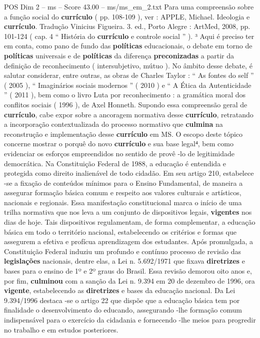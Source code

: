 \begin{textsample}{POS Dim 2 – ms – Score 43.00 – ms/ms\_em\_2.txt}
Para uma compreensão sobre a função social do \textbf{currículo} ( pp. 108-109 ), ver : APPLE, Michael.
Ideologia e \textbf{currículo}.
Tradução Vinicius Figueira. 3. ed., Porto Alegre : ArtMed, 2008, pp. 101-124 ( cap. 4 “ História do \textbf{currículo} e controle social ” ). ³ Aqui é preciso ter em conta, como pano de fundo das \textbf{políticas} educacionais, o debate em torno de \textbf{políticas} universais e de \textbf{políticas} da diferença \textbf{preconizadas} a partir da definição de reconhecimento ( intersubjetivo, mútuo ).
No âmbito desse debate, é salutar considerar, entre outras, as obras de Charles Taylor : “ As fontes do self ” ( 2005 ), “ Imaginários sociais modernos ” ( 2010 ) e “ A Ética da Autenticidade ” ( 2011 ), bem como o livro Luta por reconhecimento : a gramática moral dos conflitos sociais ( 1996 ), de Axel Honneth.
Supondo essa compreensão geral de \textbf{currículo}, cabe expor sobre a ancoragem normativa desse \textbf{currículo}, retratando a incorporação contextualizada do processo normativo que \textbf{culmina} na reconstrução e implementação desse \textbf{currículo} em MS.
O escopo deste tópico concerne mostrar o porquê do novo \textbf{currículo} e sua base legal⁴, bem como evidenciar os esforços empreendidos no sentido de provê -lo de legitimidade democrática.
Na Constituição Federal de 1988, a educação é entendida e protegida como direito inalienável de todo cidadão.
Em seu artigo 210, estabelece -se a fixação de conteúdos mínimos para o Ensino Fundamental, de maneira a assegurar formação básica comum e respeito aos valores culturais e artísticos, nacionais e regionais.
Essa manifestação constitucional marca o início de uma trilha normativa que nos leva a um conjunto de dispositivos legais, \textbf{vigentes} nos dias de hoje.
Tais dispositivos regulamentam, de forma complementar, a educação básica em todo o território nacional, estabelecendo os critérios e formas que assegurem a efetiva e profícua aprendizagem dos estudantes.
Após promulgada, a Constituição Federal induziu um profundo e contínuo processo de revisão das \textbf{legislações} nacionais, dentre elas, a Lei n. 5.692/1971 que fixava \textbf{diretrizes} e bases para o ensino de 1º e 2º graus do Brasil.
Essa revisão demorou oito anos e, por fim, \textbf{culminou} com a sanção da Lei n. 9.394 em 20 de dezembro de 1996, ora \textbf{vigente}, estabelecendo as \textbf{diretrizes} e bases da educação nacional.
Da Lei 9.394/1996 destaca -se o artigo 22 que dispõe que a educação básica tem por finalidade o desenvolvimento do educando, assegurando -lhe formação comum indispensável para o exercício da cidadania e fornecendo -lhe meios para progredir no trabalho e em estudos posteriores.

\end{textsample}
